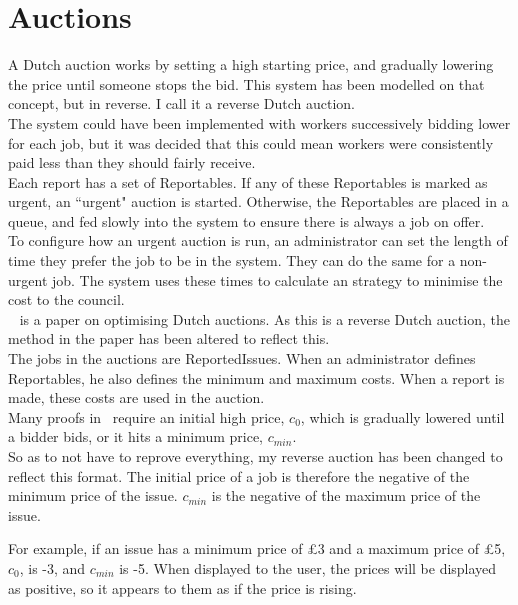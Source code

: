 \chapter{Auctions}
\label{sec:auctions}

A Dutch auction works by setting a high starting price, and gradually lowering the price until someone stops the bid. This system has been modelled on that concept, but in reverse. I call it a reverse Dutch auction. \\

The system could have been implemented with workers successively bidding lower for each job, but it was decided that this could mean workers were consistently paid less than they should fairly receive. \\

Each report has a set of Reportables. If any of these Reportables is marked as urgent, an ``urgent" auction is started. Otherwise, the Reportables are placed in a queue, and fed slowly into the system to ensure there is always a job on offer. \\

To configure how an urgent auction is run, an administrator can set the length of time they prefer the job to be in the system. They can do the same for a non-urgent job. The system uses these times to calculate an strategy to minimise the cost to the council. \\

~\cite{dutch} is a paper on optimising Dutch auctions. As this is a reverse Dutch auction, the method in the paper has been altered to reflect this. \\

The jobs in the auctions are ReportedIssues. When an administrator defines Reportables, he also defines the minimum and maximum costs. When a report is made, these costs are used in the auction. \\

Many proofs in~\cite{dutch} require an initial high price, $c_0$, which is gradually lowered until a bidder bids, or it hits a minimum price, $c_{min}$. \\

So as to not have to reprove everything, my reverse auction has been changed to reflect this format. The 
initial price of a job is therefore the negative of the minimum price of the issue. $c_{min}$ is the negative of the maximum price of the issue.

For example, if an issue has a minimum price of £3 and a maximum price of £5, $c_0$, is -3, and $c_{min}$ is -5. When displayed to the user, the prices will be displayed as positive, so it appears to them as if the price is rising. \\

